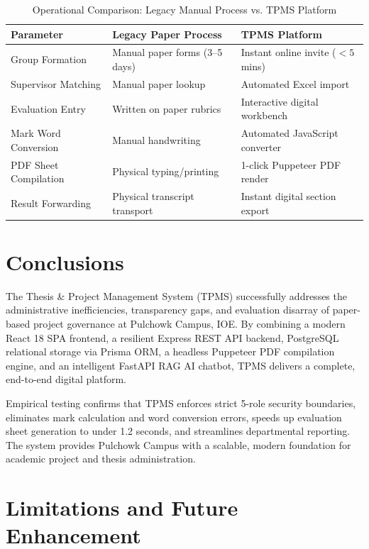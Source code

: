 \documentclass[12pt]{report}
\begin{document}
\begin{table}[H]
\centering
\caption{Operational Comparison: Legacy Manual Process vs. TPMS Platform}
\label{tab:comparison}
\begin{tabular}{l l l}
\toprule
\textbf{Parameter} & \textbf{Legacy Paper Process} & \textbf{TPMS Platform}\\
\midrule
Group Formation & Manual paper forms (3--5 days) & Instant online invite ($<5$ mins)\\
Supervisor Matching & Manual paper lookup & Automated Excel import\\
Evaluation Entry & Written on paper rubrics & Interactive digital workbench\\
Mark Word Conversion & Manual handwriting & Automated JavaScript converter\\
PDF Sheet Compilation & Physical typing/printing & 1-click Puppeteer PDF render\\
Result Forwarding & Physical transcript transport & Instant digital section export\\
\bottomrule
\end{tabular}
\end{table}

\chapter{Conclusions}
The Thesis \& Project Management System (TPMS) successfully addresses the administrative inefficiencies, transparency gaps, and evaluation disarray of paper-based project governance at Pulchowk Campus, IOE. By combining a modern React 18 SPA frontend, a resilient Express REST API backend, PostgreSQL relational storage via Prisma ORM, a headless Puppeteer PDF compilation engine, and an intelligent FastAPI RAG AI chatbot, TPMS delivers a complete, end-to-end digital platform.

Empirical testing confirms that TPMS enforces strict 5-role security boundaries, eliminates mark calculation and word conversion errors, speeds up evaluation sheet generation to under 1.2 seconds, and streamlines departmental reporting. The system provides Pulchowk Campus with a scalable, modern foundation for academic project and thesis administration.

\chapter{Limitations and Future Enhancement}
\end{document}

